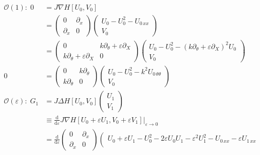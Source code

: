 \documentclass[12pt]{article}
\newcommand{\pd}[0]{\partial}
\newcommand{\dd}[0]{\mathrm{d}}
\newcommand{\mc}[1]{\mathcal{#1}}
\numberwithin{equation}{section}
\begin{document}
\begin{subequations}
    \begin{align}
       \mc O(1): \; 0 &= J\nabla H[U_0,V_0]\label{Jgrad H order 1} \\
        &= \left(\begin{array}{cc}
        0 & \pd_x \\
        \pd_x & 0
    \end{array}\right)\left(\begin{array}{c}
         U_0 - U_0^2 - U_{0\,xx}   \\
         V_0
    \end{array}\right)
    \nonumber \\
    &= \left(\begin{array}{cc}
        0 & k\pd_{\theta} + \varepsilon \pd_X\\
        k\pd_{\theta} + \varepsilon \pd_X & 0
    \end{array}\right)\left(\begin{array}{c}
         U_0 - U_0^2 - (k\pd_{\theta} + \varepsilon \pd_X)^2U_{0}   \\
         V_0
    \end{array}\right)\nonumber\\
    0 &= \left(\begin{array}{cc}
        0 & k\pd_{\theta}\\
        k\pd_{\theta}& 0
    \end{array}\right)\left(\begin{array}{c}
         U_0 - U_0^2 - k^2U_{0\, \theta \theta}   \\
         V_0
    \end{array}\right)\nonumber\\
    \mc O(\varepsilon): \; G_1 &= J\Delta H[U_0,V_0]\left(\begin{array}{c}
         U_1  \\
         V_1 
    \end{array}\right) \nonumber \\
    &\equiv \frac{\dd}{\dd \varepsilon} J \nabla H[U_0+ \varepsilon
    U_1, V_0 + \varepsilon V_1]\Big|_{\varepsilon \to 0} \nonumber \\\
    &= \frac{\dd }{\dd \varepsilon}\left(\begin{array}{cc}
        0 & \pd_x \\
        \pd_x & 0
    \end{array}\right)\left.\left(\begin{array}{c}
         U_0 + \varepsilon U_1- U_0^2 - 2\varepsilon U_0U_1 - \varepsilon^2 U_1^2 - U_{0\,xx} - \varepsilon U_{1\,xx}   \\

\end{array}
\end{align}
\end{subequations}
\end{document}
